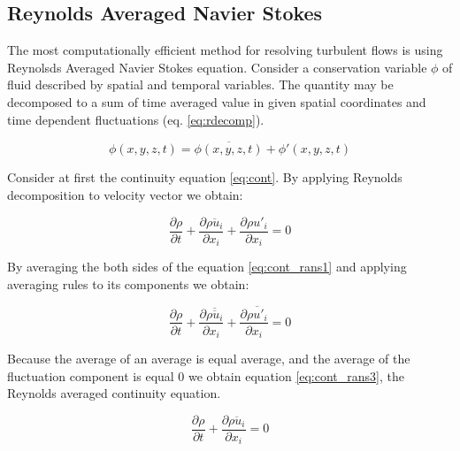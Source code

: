 \subsection{Reynolds Averaged Navier Stokes} \label{RANS}
The most computationally efficient method for resolving turbulent flows is using Reynolsds Averaged Navier Stokes equation. Consider a conservation variable $\phi$ of fluid described by spatial and temporal variables. The quantity may be decomposed to a sum of time averaged value in given spatial coordinates and time dependent fluctuations (eq. \ref{eq:rdecomp}).


\begin{equation} \label{eq:rdecomp}
\phi (x, y, z, t) = \overline{\phi (x, y, z, t)} + \phi ' (x, y, z, t)
\end{equation}

Consider at first the continuity equation \ref{eq:cont}. By applying Reynolds decomposition to velocity vector we obtain:

\begin{equation} \label{eq:cont_rans1}
\frac{\partial \rho}{\partial t} + \frac{\partial \overline{\rho u_i}}{\partial x_i} + \frac{\partial \rho u'_i}{\partial x_i} = 0
\end{equation}

By averaging the both sides of the equation  \ref{eq:cont_rans1} and applying averaging rules to its components we obtain:

\begin{equation} \label{eq:cont_rans2}
\frac{\partial \rho}{\partial t} + \frac{\partial \overline{\overline{\rho u_i}}}{\partial x_i} + \frac{\partial \overline{\rho u'_i}}{\partial x_i} = 0
\end{equation}

Because the average of an average is equal average, and  the average of the fluctuation component is equal 0 we obtain equation \ref{eq:cont_rans3}, the Reynolds averaged continuity equation.

\begin{equation} \label{eq:cont_rans3}
\frac{\partial \rho}{\partial t} + \frac{\partial \overline{\rho u_i}}{\partial x_i} = 0
\end{equation}

